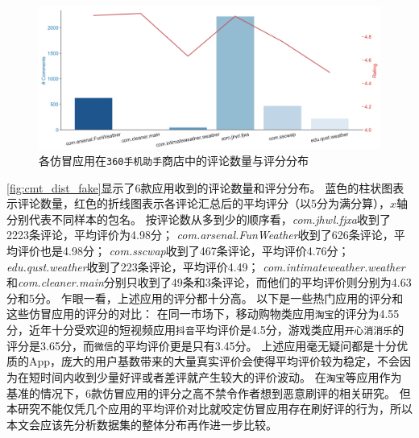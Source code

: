 %
%
%

\begin{figure}[htbp]
	\centering
	\includegraphics[width=\textwidth]{./Figures/edwin-cmt-ratings-dist-3.png}
    \caption{各仿冒应用在\texttt{360手机助手}商店中的评论数量与评分分布}
    \label{fig:cmt_dist_fake}
\end{figure}

\autoref{fig:cmt_dist_fake}显示了6款应用收到的评论数量和评分分布。
蓝色的柱状图表示评论数量，红色的折线图表示各评论汇总后的平均评分（以5分为满分算），$x$轴分别代表不同样本的包名。
按评论数从多到少的顺序看，\emph{com.jhwl.fjxa}收到了2223条评论，平均评价为4.98分；
\emph{com.arsenal.FunWeather}收到了626条评论，平均评价也是4.98分；
\emph{com.sscwap}收到了467条评论，平均评价4.76分；
\emph{edu.qust.weather}收到了223条评论，平均评价4.49；
\emph{com.intimateweather.weather}和\emph{com.cleaner.main}分别只收到了49条和3条评论，而他们的平均评价则分别为4.63分和5分。
乍眼一看，上述应用的评分都十分高。
以下是一些热门应用的评分和这些仿冒应用的评分的对比：
在同一市场下，移动购物类应用\texttt{淘宝}的评分为4.55分，近年十分受欢迎的短视频应用\texttt{抖音}平均评价是4.5分，游戏类应用\texttt{开心消消乐}的评分是3.65分，而\texttt{微信}的平均评价更是只有3.45分。
上述应用毫无疑问都是十分优质的App，庞大的用户基数带来的大量真实评价会使得平均评价较为稳定，不会因为在短时间内收到少量好评或者差评就产生较大的评价波动。
在\texttt{淘宝}等应用作为基准的情况下，6款仿冒应用的评分之高不禁令作者想到恶意刷评的相关研究。
但本研究不能仅凭几个应用的平均评价对比就咬定仿冒应用存在刷好评的行为，所以本文会应该先分析数据集的整体分布再作进一步比较。

